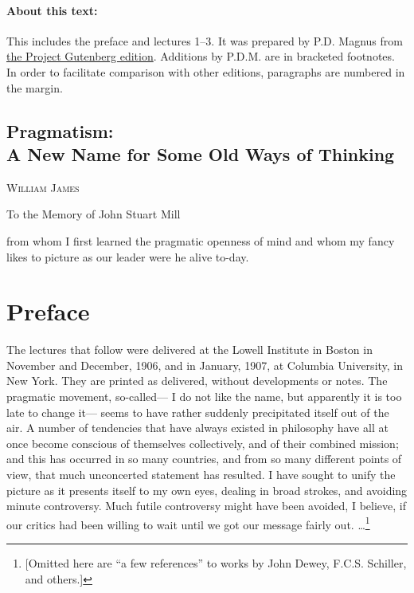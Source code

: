 \documentclass[12pt]{article}
\begin{document}

\paragraph{About this text:} This includes the preface and lectures 1--3. It was prepared by P.D. Magnus from \href{http://www.gutenberg.org/ebooks/5116}{the Project Gutenberg edition}. Additions by P.D.M. are in bracketed footnotes. In order to facilitate comparison with other editions, paragraphs are numbered in the margin.

\begin{center}
\section*{Pragmatism:\\ A New Name for Some Old Ways of Thinking}

{\textsc{William James}}
\end{center}


\begin{center}
To the Memory of John Stuart Mill

from whom I first learned the pragmatic openness of mind and whom my
fancy likes to picture as our leader were he alive to-day.
\end{center}



\section*{Preface}

The lectures that follow were delivered at the Lowell Institute in
Boston in November and December, 1906, and in January, 1907, at
Columbia University, in New York. They are printed as delivered, without developments or notes. The pragmatic movement, so-called--- I do not like the name, but apparently it is too late to change it--- seems to have rather suddenly precipitated itself out of the air. A number of tendencies that have always existed in philosophy have all at once become conscious of themselves collectively, and of their combined mission; and this has occurred in so many countries, and from so many different points of view, that much unconcerted statement has resulted. I have sought to unify the picture as it presents itself to my own eyes, dealing in broad strokes, and avoiding minute controversy. Much futile controversy might have been avoided, I believe, if our critics had been willing to wait until we got our message fairly out.
\ldots\footnote{[Omitted here are ``a few references'' to works by John Dewey, F.C.S. Schiller, and others.]}
\end{document}

